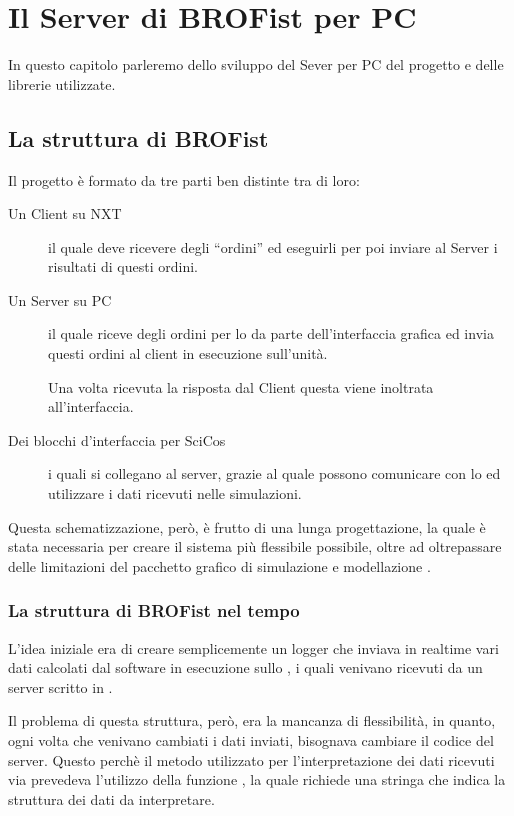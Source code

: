 \chapter{Il Server di BROFist per PC}
\label{chap:PCServ}

In questo capitolo parleremo dello sviluppo del Sever per PC
del progetto \BROFist{} e delle librerie utilizzate.

\section{La struttura di BROFist}
Il progetto \BROFist{} è formato da tre parti ben distinte tra di loro:

\begin{description}
    \item[Un Client su NXT]il quale deve ricevere degli ``ordini'' ed
        eseguirli per poi inviare al Server i risultati di questi ordini.
    \item[Un Server su PC]il quale riceve degli ordini per lo \SPAM{} da
        parte dell'interfaccia grafica ed invia questi ordini al client in
        esecuzione sull'unità.
        
        Una volta ricevuta la risposta dal Client questa viene inoltrata
        all'interfaccia.
    \item[Dei blocchi d'interfaccia per SciCos]i quali si collegano al
        server, grazie al quale possono comunicare con lo \SPAM{} ed
        utilizzare i dati ricevuti nelle simulazioni.
\end{description}

Questa schematizzazione, però, è frutto di una lunga progettazione, la
quale è stata necessaria per creare il sistema più flessibile possibile,
oltre ad oltrepassare delle limitazioni del pacchetto grafico di
simulazione e modellazione .

\subsection{La struttura di BROFist nel tempo}
L'idea iniziale era di creare semplicemente un logger che inviava in
realtime vari dati calcolati dal software in esecuzione sullo \SPAM{}, i
quali venivano ricevuti da un server scritto in .

Il problema di questa struttura, però, era la mancanza di flessibilità, in
quanto, ogni volta che venivano cambiati i dati inviati, bisognava cambiare
il codice del server. Questo perchè il metodo utilizzato per
l'interpretazione dei dati ricevuti via  prevedeva
l'utilizzo della funzione , la quale richiede una
stringa che indica la struttura dei dati da interpretare.

